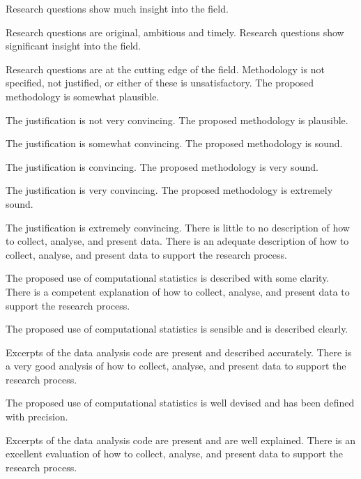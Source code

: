 \begin{markingrubric}
        \grade 		Research questions show much insight into the field.
        \par		Research questions are original, ambitious and timely.
        \grade 		Research questions show significant insight into the field.
        \par		Research questions are at the cutting edge of the field.
        \grade\fail 	Methodology is not specified, not justified, or either of these is unsatisfactory.
        \grade 		The proposed methodology is somewhat plausible.
        \par		The justification is not very convincing.
        \grade 		The proposed methodology is plausible.
        \par		The justification is somewhat convincing.
        \grade 		The proposed methodology is sound.
        \par		The justification is convincing.
        \grade 		The proposed methodology is very sound.
        \par		The justification is very convincing.
        \grade 		The proposed methodology is extremely sound.
        \par		The justification is extremely convincing.
        \grade\fail 	There is little to no description of how to collect, analyse, and present data.
        \grade 		There is an adequate description of how to collect, analyse, and present data to support the research process.
         \par		The proposed use of computational statistics is described with some clarity.        
        \grade 		There is a competent explanation of how to collect, analyse, and present data to support the research process.
         \par		The proposed use of computational statistics is sensible and is described clearly.         
        \par		Excerpts of the data analysis code are present and described accurately.                 
        \grade 		There is a very good analysis of how to collect, analyse, and present data to support the research process.
         \par		The proposed use of computational statistics is well devised and has been defined with precision.                  
        \par		Excerpts of the data analysis code are present and are well explained.   
        \grade 		There is an excellent evaluation of how to collect, analyse, and present data to support the research process.

\end{markingrubric}
